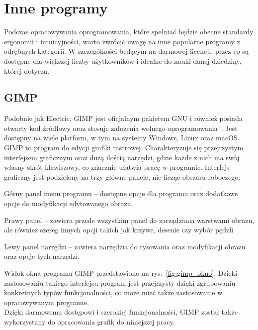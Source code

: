 \section{Inne programy}
\label{sec:inne_programy}

Podczas opracowywania oprogramowania,
które spełniać będzie obecne standardy ergonomii i intuicyjności,
warto zwrócić uwagę na inne popularne programy z odrębnych kategorii.
W szczególności będącym na darmowej licencji,
przez co są dostępne dla większej liczby użytkowników
i idealne do nauki danej dziedziny, której dotyczą.

\subsection{GIMP}
\label{subsec:gimp}

Podobnie jak Electric, GIMP jest oficjalnym pakietem GNU i również posiada otwarty kod źródłowy
oraz stosuje założenia wolnego oprogramowania~\cite{gimp_site}.\linebreak
Jest dostępny na wiele platform, w tym na systemy Windows, Linux oraz macOS.
GIMP to program do edycji grafiki rastrowej.
Charakteryzuje się przejrzystym interfejsem graficznym oraz dużą ilością narzędzi,
gdzie każde z nich ma swój własny skrót klawiszowy, co znacznie ułatwia pracę w programie.
\indent Interfejs graficzny jest podzielony na trzy główne panele, nie licząc obszaru roboczego:

\begin{citemize}
    \item Górny panel menu programu -- dostępne opcje dla programu oraz dodatkowe opcje do modyfikacji edytowanego obrazu,
    \item Prawy panel -- zawiera przede wszystkim panel do zarządzania warstwami obrazu,
    ale również szereg innych opcji takich jak krzywe, desenie czy wybór pędzli
    \item Lewy panel narzędzi -- zawiera narzędzia do rysowania oraz modyfikacji obrazu oraz opcje tych narzędzi.
\end{citemize}

Widok okna programu GIMP przedstawiono na rys.~\ref{fig:gimp_okno}.
Dzięki zastosowaniu takiego interfejsu program jest przejrzysty dzięki zgrupowaniu konkretnych typów funkcjonalności,
co może mieć także zastosowanie w opracowywanym programie. \\
\indent Dzięki darmowemu dostępowi i szerokiej funkcjonalności,
GIMP został także wykorzystany do opracowania grafik do niniejszej pracy.

